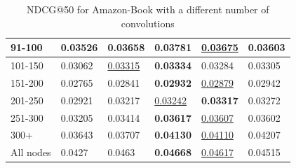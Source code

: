 \begin{table}[]
\begin{tabular}{|l|l|l|l|l|l|}
        91-100  & 0.03526                    & 0.03658                    & \textbf{0.03781}           & \underline{0.03675}        & 0.03603                    \\ \hline
        101-150 & 0.03062                    & \underline{0.03315}        & \textbf{0.03334}           & 0.03284                    & 0.03305                    \\ \hline
        151-200 & 0.02765                    & 0.02841                    & \textbf{0.02932}           & \underline{0.02879}        & 0.02942                    \\ \hline
        201-250 & 0.02921                    & 0.03217                    & \underline{0.03242}        & \textbf{0.03317}           & 0.03272                    \\ \hline
        251-300 & 0.03205                    & 0.03414                    & \textbf{0.03617}           & \underline{0.03607}        & 0.03602                    \\ \hline
        300+    & 0.03643                    & 0.03707                    & \textbf{0.04130}           & \underline{0.04110}        & 0.04207                    \\ \hline
        All nodes & 0.0427                     & 0.0463                     & \textbf{0.04668}           & \underline{0.04617}        & 0.04515                    \\ \hline
    \end{tabular}
    \caption{NDCG@50 for Amazon-Book with a different number of convolutions}
    \label{tab:Amazon-book-ndcg-evaluation-mean}
\end{table}

